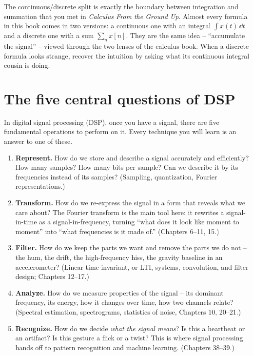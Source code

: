\begin{connectionbox}
The continuous/discrete split is exactly the boundary between integration and summation that you
met in \emph{Calculus From the Ground Up}. Almost every formula in this book comes in two
versions: a continuous one with an integral $\int x(t)\,\dd t$ and a discrete one with a sum
$\sum_n x[n]$. They are the same idea -- ``accumulate the signal'' -- viewed through the two lenses
of the calculus book. When a discrete formula looks strange, recover the intuition by asking
what its continuous integral cousin is doing.
\end{connectionbox}

\section{The five central questions of DSP}
\label{ch01:questions}

In digital signal processing (DSP), once you have a signal, there are five fundamental operations to perform on it. Every technique
you will learn is an answer to one of these.

\begin{enumerate}
\item \textbf{Represent.} How do we store and describe a signal accurately and efficiently? How
many samples? How many bits per sample? Can we describe it by its frequencies instead of its
samples? (Sampling, quantization, Fourier representations.)

\item \textbf{Transform.} How do we re-express the signal in a form that reveals what we care
about? The Fourier transform is the main tool here: it rewrites a signal-in-time as a
signal-in-frequency, turning ``what does it look like moment to moment'' into ``what frequencies is
it made of.'' (Chapters 6--11, 15.)

\item \textbf{Filter.} How do we keep the parts we want and remove the parts we do not -- the
hum, the drift, the high-frequency hiss, the gravity baseline in an accelerometer? (Linear time-invariant, or LTI, systems,
convolution, and filter design; Chapters 12--17.)

\item \textbf{Analyze.} How do we measure properties of the signal -- its dominant frequency,
its energy, how it changes over time, how two channels relate? (Spectral estimation,
spectrograms, statistics of noise, Chapters 10, 20--21.)

\item \textbf{Recognize.} How do we decide \emph{what the signal means}? Is this a heartbeat or
an artifact? Is this gesture a flick or a twist? This is where signal processing hands off to
pattern recognition and machine learning. (Chapters 38--39.)
\end{enumerate}

